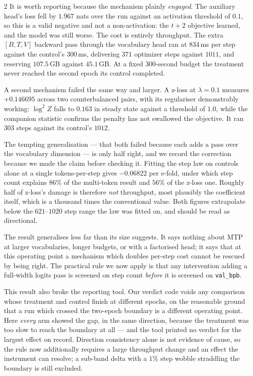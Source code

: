 \documentclass[10pt]{article}
\begin{document}
\begin{multicols}{2}
It is worth reporting because the mechanism plainly \emph{engaged}. The auxiliary head's
loss fell by $1.967$ nats over the run against an activation threshold of $0.1$, so this is
a valid negative and not a non-activation: the $t+2$ objective learned, and the model was
still worse. The cost is entirely throughput. The extra $[B,T,V]$ backward pass through the
vocabulary head ran at $834$\,ms per step against the control's $300$\,ms, delivering $371$
optimizer steps against $1011$, and reserving $107.5$\,GB against $45.1$\,GB. At a fixed
$300$-second budget the treatment never reached the second epoch its control completed.

A second mechanism failed the same way and larger. A z-loss at $\lambda=0.1$ measures
$+0.146695$ across two counterbalanced pairs, with its regulariser demonstrably working:
$\log^2 Z$ falls to $0.163$ in steady state against a threshold of $1.0$, while the
companion statistic confirms the penalty has not swallowed the objective. It ran $303$ steps
against its control's $1012$.

The tempting generalisation --- that both failed because each adds a pass over the
vocabulary dimension --- is only half right, and we record the correction because we made
the claim before checking it. Fitting the step law on controls alone at a single
tokens-per-step gives $-0.06822$ per e-fold, under which step count explains $86\%$ of the
multi-token result and $56\%$ of the z-loss one. Roughly half of z-loss's damage is
therefore \emph{not} throughput, most plausibly the coefficient itself, which is a thousand
times the conventional value. Both figures extrapolate below the $621$--$1020$ step range
the law was fitted on, and should be read as directional.

The result generalises less far than its size suggests. It says nothing about MTP at larger
vocabularies, longer budgets, or with a factorised head; it says that at this operating
point a mechanism which doubles per-step cost cannot be rescued by being right. The
practical rule we now apply is that any intervention adding a full-width logits pass is
screened on step count \emph{before} it is screened on \texttt{val\_bpb}.

This result also broke the reporting tool. Our verdict code voids any comparison whose
treatment and control finish at different epochs, on the reasonable ground that a run which
crossed the two-epoch boundary is a different operating point. Here \emph{every} arm showed
the gap, in the same direction, because the treatment was too slow to reach the boundary at
all --- and the tool printed no verdict for the largest effect on record. Direction
consistency alone is not evidence of cause, so the rule now additionally requires a large
throughput change and an effect the instrument can resolve; a sub-band delta with a $1\%$
step wobble straddling the boundary is still excluded.


\end{multicols}
\end{document}
